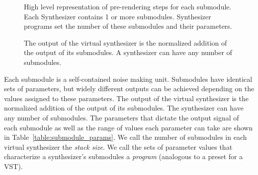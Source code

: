 \documentclass[\main/thesis.tex]{subfiles}
\begin{document}
 \begin{figure}[htbp]
    \begin{center}
    \end{center}
    \caption{High level representation of pre-rendering steps for each submodule. Each Synthesizer contains 1 or more submodules. Synthesizer programs set the number of these submodules and their parameters.
    }
\label{fig:submodule}
\end{figure}

 \begin{figure}[htbp]
    \begin{center}
    \end{center}
    \caption{The output of the virtual synthesizer is the normalized addition of the output of its submodules. A synthesizer can have any number of submodules. 
    }
\label{fig:synth_modules}
\end{figure}
 Each submodule is a self-contained noise making unit. Submodules have identical sets of parameters, but widely different outputs can be achieved depending on the values assigned to these parameters. The output of the virtual synthesizer is the normalized addition of the output of its submodules. The synthesizer can have any number of submodules. The parameters that dictate the output signal of each submodule as well as the range of values each parameter can take are shown in Table~\ref{table:submodule_params}. We call the number of submodules in each virtual synthesizer the \textit{stack size}. We call the sets of parameter values that characterize a synthesizer's submodules a \textit{program} (analogous to a preset for a VST).  
\end{document}
